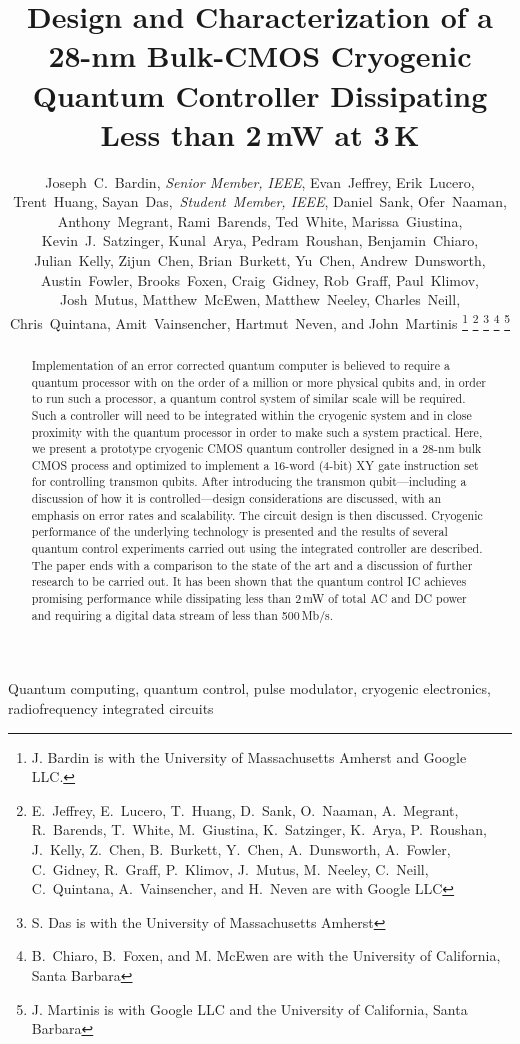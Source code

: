 \documentclass[journal]{IEEEtran}
\newcommand{\CR}[1]{{\color{black}#1}}
\begin{document}
\title{Design and Characterization of a 28-nm Bulk-CMOS Cryogenic Quantum Controller Dissipating Less than 2\,mW at 3\,K}
\author{Joseph~C.~Bardin, \emph{Senior Member, IEEE}, Evan~Jeffrey, Erik~Lucero, Trent~Huang, Sayan~Das,~\emph{Student~Member, IEEE}, Daniel~Sank,  Ofer~Naaman, Anthony~Megrant, Rami~Barends, Ted~White, Marissa~Giustina,  Kevin~J.~Satzinger, Kunal~Arya,  Pedram~Roushan, Benjamin~Chiaro, Julian~Kelly, Zijun~Chen, Brian~Burkett, Yu~Chen, Andrew~Dunsworth, Austin~Fowler, Brooks~Foxen, Craig~Gidney, Rob~Graff, Paul~Klimov, Josh~Mutus, Matthew~McEwen,  Matthew~Neeley, Charles~Neill, Chris~Quintana, Amit~Vainsencher, Hartmut~Neven, and John~Martinis
\thanks{J. Bardin is with the University of Massachusetts Amherst and Google LLC.}
\thanks{E.~Jeffrey, E.~Lucero, T.~Huang, D.~Sank, O.~Naaman, A.~Megrant, R.~Barends, T.~White, M.~Giustina, K.~Satzinger, K.~Arya, P.~Roushan, J.~Kelly, Z.~Chen, B.~Burkett, Y.~Chen, A.~Dunsworth, A.~Fowler, C.~Gidney, R.~Graff, P.~Klimov, J.~Mutus,  M.~Neeley, C.~Neill, C.~Quintana, A.~Vainsencher, and H.~Neven are with Google LLC}
\thanks{S. Das is with the University of Massachusetts Amherst}
\thanks{B.~Chiaro, B.~Foxen, and M. McEwen are with the University of California, Santa Barbara}
\thanks{J. Martinis is with Google LLC and the University of California, Santa Barbara}}
\maketitle
\begin{abstract}
Implementation of an error corrected quantum computer is believed to require a quantum processor with on the order of a million or more physical qubits and, in order to run such a processor, a quantum control system of similar scale will be required. Such a controller will need to be integrated within the cryogenic system and in close proximity with the quantum processor in order to make such a system practical. Here, we present a prototype cryogenic CMOS quantum controller designed in a 28-nm bulk CMOS process and optimized to implement a \CR{16-word (4-bit)} XY gate instruction set for \CR{controlling} transmon qubits. After introducing the transmon qubit\CR{---}including a discussion of how it is controlled\CR{---}design considerations are discussed, with an emphasis on error rates and scalability. The circuit design is then discussed. Cryogenic performance of the underlying technology is presented and the results of several quantum control experiments carried out using the integrated controller are described. The paper ends with a comparison to the state of the art and a discussion of further research to be carried out. It has been shown that the quantum control IC achieves \CR{promising performance} %
while dissipating less than 2\,mW of total AC and DC power and requiring a digital data stream of less than 500\,Mb/s.
\end{abstract}
\begin{IEEEkeywords}
Quantum computing, quantum control, pulse modulator, cryogenic electronics, radiofrequency integrated circuits 
\end{IEEEkeywords}
\end{document}
